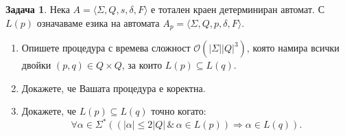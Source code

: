 \documentclass[a4paper]{article}
\theoremstyle{definition}
\newtheorem{problem}{Задача}
\begin{document}
\begin{problem}
Нека $A=\langle \Sigma,Q,s,\delta,F\rangle$ е тотален краен детерминиран автомат. С $L(p)$ означаваме езика на автомата
$A_p=\langle \Sigma,Q,p,\delta,F\rangle$. 
\begin{enumerate}
\item Опишете  процедура с времева сложност $\mathcal{O}(|\Sigma||Q|^3)$, която намира всички двойки $(p,q)\in Q\times Q$, за които $L(p)\subseteq L(q)$.
\item Докажете, че Вашата процедура е коректна.
\item Докажете, че $L(p)\subseteq L(q)$ точно когато:
\begin{equation*}
\forall \alpha\in \Sigma^*((|\alpha|\le 2|Q|\, \&\, \alpha\in L(p) )\Rightarrow \alpha\in L(q)).
\end{equation*}
\end{enumerate}
\end{problem}



\end{document}
